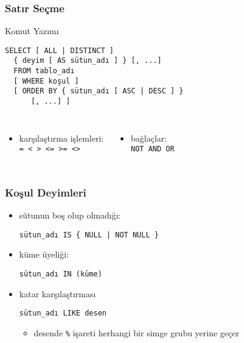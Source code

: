 \documentclass[dvipsnames]{beamer}
\theoremstyle{definition}
\theoremstyle{example}
\theoremstyle{plain}
\begin{document}
\begin{frame}[fragile]
  \frametitle{Satır Seçme}

  \begin{block}{Komut Yazımı}
    \begin{lstlisting}
SELECT [ ALL | DISTINCT ]
  { deyim [ AS sütun_adı ] } [, ...]
  FROM tablo_adı
  [ WHERE koşul ]
  [ ORDER BY { sütun_adı [ ASC | DESC ] }
      [, ...] ]
    \end{lstlisting}
  \end{block}

  \pause
  \begin{columns}
    \begin{itemize}
      \item karşılaştırma işlemleri:\\
        \lstinline!= < > <= >= <>!
    \end{itemize}

    \begin{itemize}
      \item bağlaçlar:\\
        \lstinline!NOT AND OR!
    \end{itemize}
  \end{columns}
\end{frame}

\begin{frame}[fragile]
  \frametitle{Koşul Deyimleri}

  \begin{itemize}
    \item sütunun boş olup olmadığı:\\
    \begin{lstlisting}
sütun_adı IS { NULL | NOT NULL }
    \end{lstlisting}

    \pause
    \item küme üyeliği:\\
    \begin{lstlisting}
sütun_adı IN (küme)
    \end{lstlisting}

    \pause
    \item katar karşılaştırması
    \begin{lstlisting}
sütun_adı LIKE desen
    \end{lstlisting}
    \begin{itemize}
      \item desende \lstinline!%! işareti herhangi bir simge grubu yerine geçer
    \end{itemize}
  \end{itemize}
\end{frame}
\end{document}
